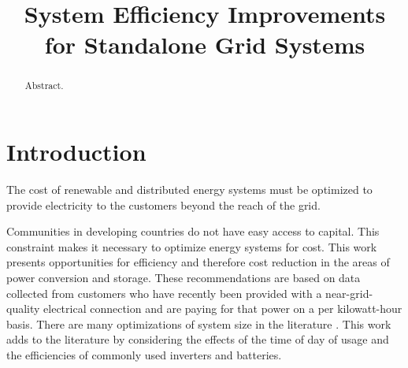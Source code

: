 \documentclass[conference]{IEEEtran}
\title{System Efficiency Improvements for Standalone Grid Systems}
\begin{document}


\author{
\and
{}
}

\maketitle

\begin{abstract}
Abstract.
\end{abstract}

\section{Introduction}

The cost of renewable and distributed energy systems must be
optimized to provide electricity to the customers beyond the
reach of the grid.

Communities in developing countries do not have easy access
to capital.
This constraint makes it necessary to optimize energy systems
for cost.
This work presents opportunities for efficiency and therefore
cost reduction in the areas of power conversion and storage.
These recommendations are based on data collected from customers
who have recently been provided with a near-grid-quality
electrical connection and are paying for that power on a
per kilowatt-hour basis.
There are many optimizations of system size in the literature
\cite{optimizations}.
This work adds to the literature by considering the effects
of the time of day of usage and the efficiencies of commonly
used inverters and batteries.
\end{document}
